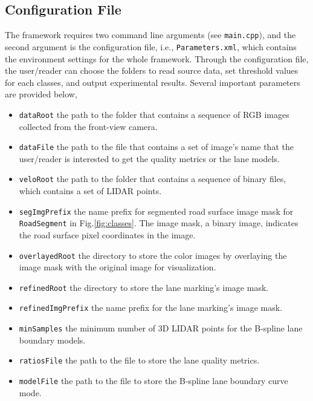 \documentclass[a4paper]{article}
\begin{document}
\subsection{Configuration File}

The framework requires two command line arguments (see \verb+main.cpp+), and the second argument is the configuration file, i.e., \verb+Parameters.xml+, which contains the environment settings for the whole framework. Through the configuration file, the user/reader can choose the folders to read source data, set threshold values for each classes, and output experimental results. Several important parameters are provided below,
\begin{itemize}
	\item \verb+dataRoot+ the path to the folder that contains a sequence of  RGB images collected from the front-view camera. 
	\item  \verb+dataFile+ the path to the file that contains a set of image's name that the user/reader is interested to get the quality metrics or the lane models. 
	\item \verb+veloRoot+ the path to the folder that contains a sequence of binary files, which contains a set of LIDAR points. 
	\item \verb+segImgPrefix+  the name prefix for segmented road surface image mask for \verb+RoadSegment+ in Fig.\ref{fig:classes}. The image mask, a binary image, indicates the road surface pixel coordinates in the  image. 
	\item \verb+overlayedRoot+  the directory to store the color images by overlaying the image mask with the original image for visualization. 
	\item \verb+refinedRoot+ the directory to store the lane marking's image mask.
	\item \verb+refinedImgPrefix+ the name prefix for the lane marking's image mask.
	\item \verb+minSamples+ the minimum number of 3D LIDAR points for the B-spline lane boundary models.
	\item \verb+ratiosFile+ the path to the file to store the lane quality metrics.	
	\item \verb+modelFile+ the path to the file to store the B-spline lane boundary curve mode.
\end{itemize} 
\end{document}
